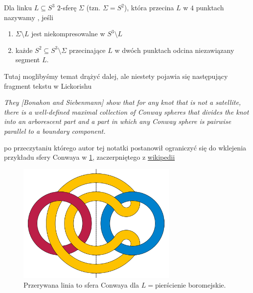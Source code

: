 \documentclass{article}
\begin{document}
\begin{deff}
  Dla linku $L\subseteq S^3$ $2$-sferę $\Sigma$ (tzn. $\Sigma=S^2$), która przecina $L$ w $4$ punktach nazywamy , jeśli 
  \begin{enumerate}
    \item $\Sigma\setminus L$ jest niekompresowalne w $S^3\setminus L$
    \item każde $S^2\subseteq S^3\setminus \Sigma$ przecinające $L$ w dwóch punktach odcina niezawiązany segment $L$. 
  \end{enumerate}
\end{deff}

Tutaj moglibyśmy temat drążyć dalej, ale niestety pojawia się następujący fragment tekstu w Lickorishu

\begin{adjustwidth}{5cm}{5cm}
\begin{center}
  \slshape 
  They \emph{[Bonahon and Siebenmann]} show that for any knot that is not a
satellite, there is a well-defined maximal collection of Conway spheres that divides
the knot into an arborescent part and a part in which any Conway sphere is pairwise
parallel to a boundary component.
\end{center}
\end{adjustwidth}

po przeczytaniu którego autor tej notatki postanowił ograniczyć się do wklejenia przykładu sfery Conwaya w \cref{conway sphere}, zaczerpniętego z \href{https://en.wikipedia.org/wiki/Conway_sphere#/media/File:Algebraic_Borromean_link_diagram.svg}{wikipedii}
\begin{figure}[h]\centering
  \includegraphics[width=0.7\textwidth]{conway-sphere.png}
  \caption{\label{conway sphere}Przerywana linia to sfera Conwaya dla $L=$pierścienie boromejskie.}
\end{figure}
\end{document}
